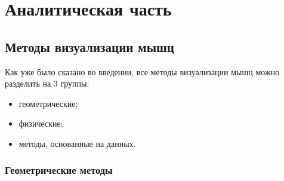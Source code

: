 \chapter{Аналитическая часть}

\section{Методы визуализации мышц}

Как уже было сказано во введении, все методы визуализации мышц можно разделить на 3 группы:
\begin{itemize}
	\item геометрические;
	\item физические;
	\item методы, основанные на данных.
\end{itemize}

\subsection{Геометрические методы}
